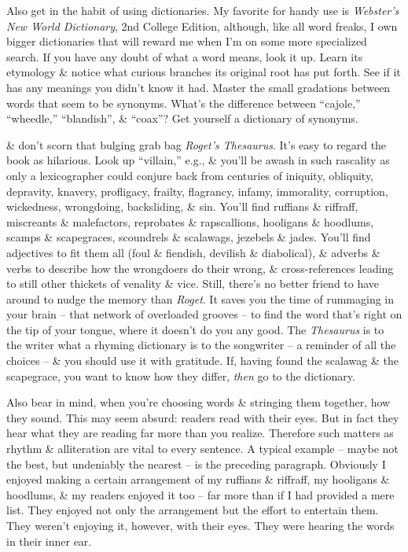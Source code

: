 \documentclass{article}
\begin{document}
Also get in the habit of using dictionaries. My favorite for handy use is \textit{Webster's New World Dictionary}, 2nd College Edition, although, like all word freaks, I own bigger dictionaries that will reward me when I'm on some more specialized search. If you have any doubt of what a word means, look it up. Learn its etymology \& notice what curious branches its original root has put forth. See if it has any meanings you didn't know it had. Master the small gradations between words that seem to be synonyms. What's the difference between ``cajole,'' ``wheedle,'' ``blandish'', \& ``coax''? Get yourself a dictionary of synonyms.

\& don't scorn that bulging grab bag \textit{Roget's Thesaurus}. It's easy to regard the book as hilarious. Look up ``villain,'' e.g., \& you'll be awash in such rascality as only a lexicographer could conjure back from centuries of iniquity, obliquity, depravity, knavery, profligacy, frailty, flagrancy, infamy, immorality, corruption, wickedness, wrongdoing, backsliding, \& sin. You'll find ruffians \& riffraff, miscreants \& malefactors, reprobates \& rapscallions, hooligans \& hoodlums, scamps \& scapegraces, scoundrels \& scalawags, jezebels \& jades. You'll find adjectives to fit them all (foul \& fiendish, devilish \& diabolical), \& adverbs \& verbs to describe how the wrongdoers do their wrong, \& cross-references leading to still other thickets of venality \& vice. Still, there's no better friend to have around to nudge the memory than \textit{Roget}. It saves you the time of rummaging in your brain -- that network of overloaded grooves -- to find the word that's right on the tip of your tongue, where it doesn't do you any good. The \textit{Thesaurus} is to the writer what a rhyming dictionary is to the songwriter -- a reminder of all the choices -- \& you should use it with gratitude. If, having found the scalawag \& the scapegrace, you want to know how they differ, \textit{then} go to the dictionary.

Also bear in mind, when you're choosing words \& stringing them together, how they sound. This may seem absurd: readers read with their eyes. But in fact they hear what they are reading far more than you realize. Therefore such matters as rhythm \& alliteration are vital to every sentence. A typical example -- maybe not the best, but undeniably the nearest -- is the preceding paragraph. Obviously I enjoyed making a certain arrangement of my ruffians \& riffraff, my hooligans \& hoodlums, \& my readers enjoyed it too -- far more than if I had provided a mere list. They enjoyed not only the arrangement but the effort to entertain them. They weren't enjoying it, however, with their eyes. They were hearing the words in their inner ear.
\end{document}
